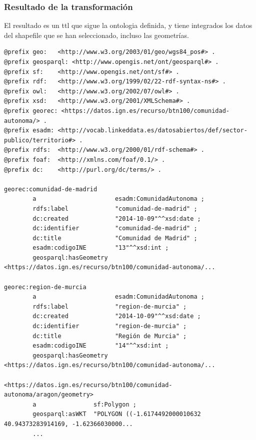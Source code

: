 \subsubsection{Resultado de la transformación}

El resultado es un ttl que sigue la ontologia definida, y tiene integrados los datos del shapefile que se han
seleccionado, incluso las geometrías.

\footnotesize
\begin{verbatim}
@prefix geo:   <http://www.w3.org/2003/01/geo/wgs84_pos#> .
@prefix geosparql: <http://www.opengis.net/ont/geosparql#> .
@prefix sf:    <http://www.opengis.net/ont/sf#> .
@prefix rdf:   <http://www.w3.org/1999/02/22-rdf-syntax-ns#> .
@prefix owl:   <http://www.w3.org/2002/07/owl#> .
@prefix xsd:   <http://www.w3.org/2001/XMLSchema#> .
@prefix georec: <https://datos.ign.es/recurso/btn100/comunidad-autonoma/> .
@prefix esadm: <http://vocab.linkeddata.es/datosabiertos/def/sector-publico/territorio#> .
@prefix rdfs:  <http://www.w3.org/2000/01/rdf-schema#> .
@prefix foaf:  <http://xmlns.com/foaf/0.1/> .
@prefix dc:    <http://purl.org/dc/terms/> .

georec:comunidad-de-madrid
        a                      esadm:ComunidadAutonoma ;
        rdfs:label             "comunidad-de-madrid" ;
        dc:created             "2014-10-09"^^xsd:date ;
        dc:identifier          "comunidad-de-madrid" ;
        dc:title               "Comunidad de Madrid" ;
        esadm:codigoINE        "13"^^xsd:int ;
        geosparql:hasGeometry  <https://datos.ign.es/recurso/btn100/comunidad-autonoma/...

georec:region-de-murcia
        a                      esadm:ComunidadAutonoma ;
        rdfs:label             "region-de-murcia" ;
        dc:created             "2014-10-09"^^xsd:date ;
        dc:identifier          "region-de-murcia" ;
        dc:title               "Región de Murcia" ;
        esadm:codigoINE        "14"^^xsd:int ;
        geosparql:hasGeometry  <https://datos.ign.es/recurso/btn100/comunidad-autonoma/...

<https://datos.ign.es/recurso/btn100/comunidad-autonoma/aragon/geometry>
        a                sf:Polygon ;
        geosparql:asWKT  "POLYGON ((-1.6174492000010632 40.94373283914169, -1.62366030000...
        ...
\end{verbatim}
\normalsize

